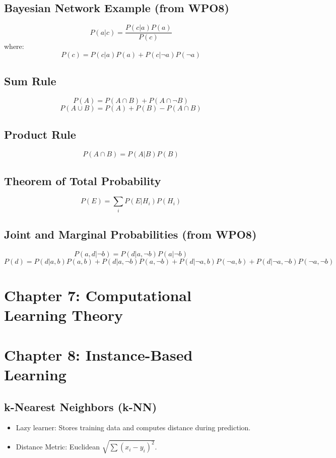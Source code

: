 \documentclass[10pt,a4paper]{article}
\begin{document}
\subsection*{Bayesian Network Example (from WPO8)}
\[
P(a|c) = \frac{P(c|a)P(a)}{P(c)}
\]
where:
\[
P(c) = P(c|a)P(a) + P(c|\neg a)P(\neg a)
\]

\subsection*{Sum Rule}
\[
P(A) = P(A \cap B) + P(A \cap \neg B)
\]
\[
P(A \cup B) = P(A) + P(B) - P(A \cap B)
\]
\subsection*{Product Rule}
\[
P(A \cap B) = P(A|B)P(B)
\]

\subsection*{Theorem of Total Probability}
\[
P(E) = \sum_{i} P(E|H_i)P(H_i)
\]


\subsection*{Joint and Marginal Probabilities (from WPO8)}
\[
P(a, d|\neg b) = P(d|a, \neg b)P(a|\neg b)
\]
\[
P(d) = P(d|a, b)P(a, b) + P(d|a, \neg b)P(a, \neg b) + P(d|\neg a, b)P(\neg a, b) + P(d|\neg a, \neg b)P(\neg a, \neg b)
\]

\section*{Chapter 7: Computational Learning Theory}


\section*{Chapter 8: Instance-Based Learning}
\subsection*{k-Nearest Neighbors (k-NN)}
\begin{itemize}
	\item Lazy learner: Stores training data and computes distance during prediction.
	\item Distance Metric: Euclidean \( \sqrt{\sum (x_i - y_i)^2} \).
\end{itemize}
\end{document}
